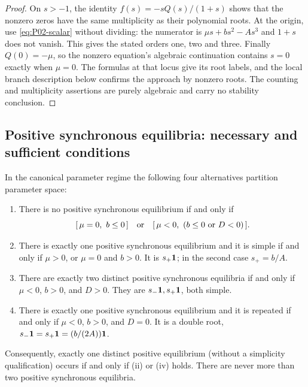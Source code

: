 \begin{proof}
On $s>-1$, the identity $f(s)=-sQ(s)/(1+s)$ shows that the
nonzero zeros have the same multiplicity as their polynomial roots.
At the origin, use \eqref{eq:P02-scalar} without dividing:
the numerator is $\mu s+bs^2-As^3$ and $1+s$ does not vanish.
This gives the stated orders one, two and three. Finally $Q(0)=-\mu$,
so the nonzero equation's algebraic continuation contains $s=0$
exactly when $\mu=0$. The formulas at that locus give its root
labels, and the local branch description below confirms the approach
by nonzero roots. The counting and multiplicity assertions are purely
algebraic and carry no stability conclusion.
\end{proof}

\subsection{Positive synchronous equilibria: necessary and sufficient conditions}

\begin{theorem}
\label{thm:P02-positive}
In the canonical parameter regime the following four alternatives
partition parameter space:
\begin{enumerate}[label=(\roman*),leftmargin=*]
\item There is no positive synchronous equilibrium if and only if
\begin{equation}
\label{eq:P02-none}
 [\,\mu=0,\ b\le0\,]
 \quad\hbox{or}\quad
 [\,\mu<0,\ (b\le0\ \hbox{or}\ D<0)\,].
\end{equation}
\item There is exactly one positive synchronous equilibrium and it is
simple if and only if $\mu>0$, or $\mu=0$ and $b>0$.
It is $s_+\mathbf{1}$; in the second case $s_+=b/A$.
\item There are exactly two distinct positive synchronous equilibria
if and only if $\mu<0$, $b>0$, and $D>0$. They are
$s_-\mathbf{1},s_+\mathbf{1}$, both simple.
\item There is exactly one positive synchronous equilibrium and it
is repeated if and only if $\mu<0$, $b>0$, and $D=0$.
It is a double root, $s_-\mathbf{1}=s_+\mathbf{1}=(b/(2A))\mathbf{1}$.
\end{enumerate}
Consequently, exactly one distinct positive equilibrium (without a
simplicity qualification) occurs if and only if (ii) or (iv) holds.
There are never more than two positive synchronous equilibria.
\end{theorem}

